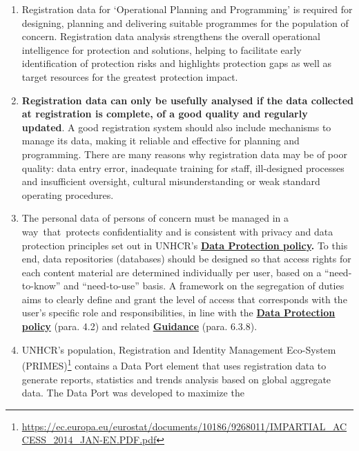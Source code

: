\documentclass[
]{article}
\begin{document}
\begin{enumerate}
\def\labelenumi{\arabic{enumi}.}
\setcounter{enumi}{185}
\item
  Registration data for `Operational Planning and Programming' is
  required for designing, planning and delivering suitable programmes
  for the population of concern. Registration data analysis
  strengthens the overall operational intelligence for protection and
  solutions, helping to facilitate early identification of protection
  risks and highlights protection gaps as well as target resources for
  the greatest protection impact.
\item
  \textbf{Registration data can only be usefully analysed if the data
  collected at registration is complete, of a good quality and
  regularly updated}. A good registration system should also include
  mechanisms to manage its data, making it reliable and effective for
  planning and programming. There are many reasons why registration
  data may be of poor quality: data entry error, inadequate training
  for staff, ill-designed processes and insufficient oversight,
  cultural misunderstanding or weak standard operating procedures.
\item
  The personal data of persons of concern must be managed in a
  way~that~protects confidentiality and is consistent with privacy and
  data protection principles set out in UNHCR's \textbf{\href{http://www.refworld.org/pdfid/55643c1d4.pdf}{Data Protection
  policy}{.}}
  To this end, data repositories (databases) should be designed so
  that access rights for each content material are determined
  individually per user, based on a ``need-to-know'' and ``need-to-use''
  basis. A framework on the segregation of duties aims to clearly
  define and grant the level of access that corresponds with the
  user's specific role and responsibilities, in line with the \href{http://www.refworld.org/pdfid/55643c1d4.pdf}{\textbf{Data
  Protection policy}}
  (para. 4.2) and related
  \href{https://www.refworld.org/cgi-bin/texis/vtx/rwmain?page=search\&docid=5b360f4d4\&skip=0\&query=guidance\%20data\%20protection\%20unhcr}{\textbf{Guidance}}
  (para. 6.3.8).
\item
  UNHCR's population, Registration and Identity Management Eco-System
  (PRIMES)\footnote{\url{https://ec.europa.eu/eurostat/documents/10186/9268011/IMPARTIAL_ACCESS_2014_JAN-EN.PDF.pdf}} contains a Data Port element that uses registration
  data to generate reports, statistics and trends analysis based on
  global aggregate data. The Data Port was developed to maximize the

\end{enumerate}
\end{document}
